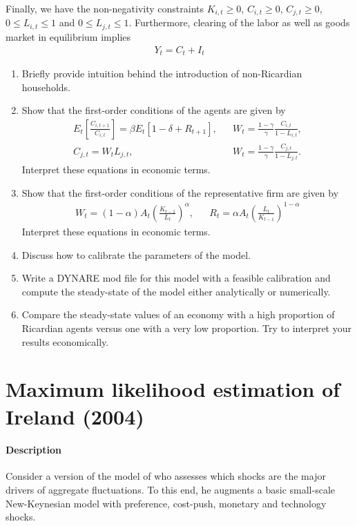 \documentclass{article}
\begin{document}
Finally, we have the non-negativity constraints	$K_{i,t} \geq0$, $C_{i,t} \geq 0$, $C_{j,t} \geq 0$, $0\leq L_{i,t} \leq 1$ and $0\leq L_{j,t} \leq 1$. Furthermore, clearing of the labor as well as goods market in equilibrium implies
\begin{align*}
Y_t = C_t + I_t
\end{align*}

\begin{enumerate}
	\item Briefly provide intuition behind the introduction of non-Ricardian households.
	\item Show that the first-order conditions of the agents are given by
		\begin{align*}
		E_t\left[\frac{C_{i,t+1}}{C_{i,t}}\right] = \beta E_t\left[1-\delta + R_{t+1}\right],&&		
		W_t = \frac{1-\gamma}{\gamma} \frac{C_{i,t}}{1-L_{i,t}},\\
		C_{j,t} = W_t L_{j,t}, &&
		W_t = \frac{1-\gamma}{\gamma} \frac{C_{j,t}}{1-L_{j,t}}.
		\end{align*}
	Interpret these equations in economic terms.
	
	\item Show that the first-order conditions of the representative firm are given by
	\begin{align*}
	W_t = (1-\alpha) A_t \left(\frac{K_{t-1}}{L_t}\right)^\alpha, &&	R_t = \alpha A_t \left(\frac{L_t}{K_{t-1}}\right)^{1-\alpha}
	\end{align*}
	Interpret these equations in economic terms.
	\item Discuss how to calibrate the parameters of the model.
	\item Write a DYNARE mod file for this model with a feasible calibration and compute the steady-state of the model either analytically or numerically.
	\item Compare the steady-state values of an economy with a high proportion of Ricardian agents versus one with a very low proportion.
	Try to interpret your results economically.
\end{enumerate} 

\newpage

\section[Maximum likelihood estimation of Ireland (2004)]{Maximum likelihood estimation of Ireland (2004)\label{ex:Ireland2004ML}}
\paragraph{Description}
Consider a version of the model of \textcite{Ireland_2004_TechnologyShocksNew} who assesses which shocks are the major drivers of aggregate fluctuations.
To this end, he augments a basic small-scale New-Keynesian model with preference, cost-push, monetary and technology shocks.
\end{document}
